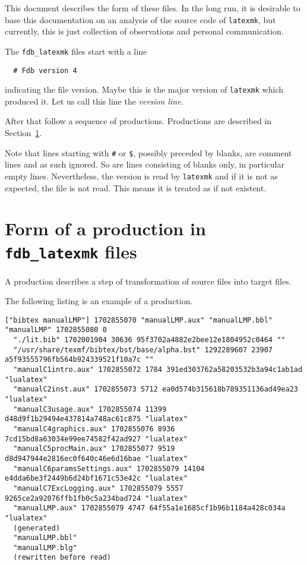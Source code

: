\documentclass[a4paper]{article}%
\newcommand{\latexmk}{\texttt{latexmk}}
\begin{document}
This document describes the form of these files. 
In the long run, it is desirable 
to base this documentation on an analysis of the source code of \latexmk, 
but currently, this is just collection of observations and personal communication. 


The \texttt{fdb\_latexmk} files start with a line 
%
\begin{verbatim}
  # Fdb version 4
\end{verbatim}
%
indicating the file version. 
Maybe this is the major version of \latexmk{} which produced it. 
Let us call this line the \emph{version line}. 

After that follow a sequence of productions. 
Productions are described in Section~\ref{sec:prod}. 

Note that lines starting with \texttt{\#} or \texttt{\$}, 
possibly preceded by blanks, are comment lines and as such ignored. 
So are lines consisting of blanks only, in particular empty lines. 
Nevertheless, the version is read by \texttt{latexmk} 
and if it is not as expected, the file is not read. 
This means it is treated as if not existent. 


\section{Form of a production in \texttt{fdb\_latexmk} files }\label{sec:prod}

A production describes a step of transformation of source files into target files. 

The following listing is an example of a production. 

\begin{lstlisting}[basicstyle=\scriptsize]
["bibtex manualLMP"] 1702855070 "manualLMP.aux" "manualLMP.bbl" "manualLMP" 1702855080 0
  "./lit.bib" 1702001904 30636 95f3702a4882e2bee12e1804952c0464 ""
  "/usr/share/texmf/bibtex/bst/base/alpha.bst" 1292289607 23907 a5f93555796fb564b924339521f10a7c ""
  "manualC1intro.aux" 1702855072 1784 391ed303762a58203532b3a94c1ab1ad "lualatex"
  "manualC2inst.aux" 1702855073 5712 ea0d574b315618b789351136ad49ea23 "lualatex"
  "manualC3usage.aux" 1702855074 11399 d48d9f1b29494e437814a748ac61c875 "lualatex"
  "manualC4graphics.aux" 1702855076 8936 7cd15bd8a63034e99ee74582f42ad927 "lualatex"
  "manualC5procMain.aux" 1702855077 9519 d8d947944e2816ec0f640c46e6d16bae "lualatex"
  "manualC6paramsSettings.aux" 1702855079 14104 e4dda6be3f2449b6d24bf1671c53e42c "lualatex"
  "manualC7ExcLogging.aux" 1702855079 5557 9265ce2a92076ffb1fb0c5a234bad724 "lualatex"
  "manualLMP.aux" 1702855079 4747 64f55a1e1685cf1b96b1184a428c034a "lualatex"
  (generated)
  "manualLMP.bbl"
  "manualLMP.blg"
  (rewritten before read)
\end{lstlisting}
\end{document}
